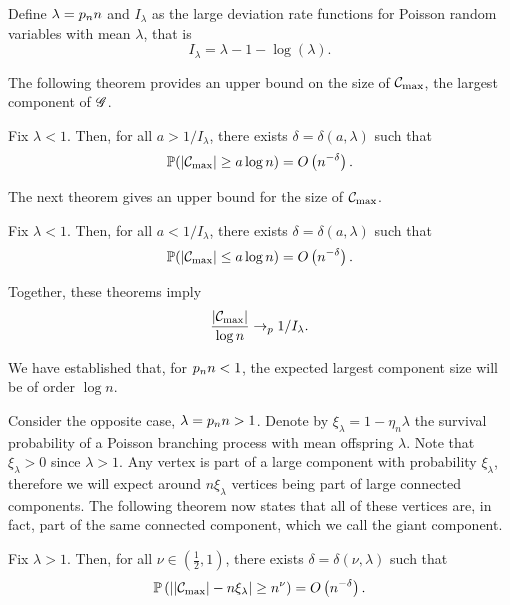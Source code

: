 Define $\lambda = p_n n$ and $I_{\lambda}$ as the large deviation rate functions for Poisson random variables with mean $\lambda$,
that is
\begin{equation}
	I_{\lambda} = \lambda - 1 - \log(\lambda).
\end{equation}

The following theorem provides an upper bound on the size of $\mathcal{C}_{\max}$, the largest component of $\mathscr{G}$.
\begin{theorem}
	Fix $\lambda < 1$. 
	Then, for all $a > 1/I_{\lambda}$, 
	there exists $\delta = \delta(a, \lambda)$ such that
	\begin{equation}
		\mathbb{P}( |\mathcal{C}_{\max}| \geq a \log n ) = O\left(n^{-\delta}\right).
	\end{equation}
\end{theorem}

The next theorem gives an upper bound for the size of $\mathcal{C}_{\max}$.
\begin{theorem}
	Fix $\lambda < 1$. 
	Then, for all $a < 1/I_{\lambda}$, 
	there exists $\delta = \delta(a, \lambda)$ such that
	\begin{equation}
	\mathbb{P}( |\mathcal{C}_{\max}| \leq a \log n ) = O\left(n^{-\delta}\right).
	\end{equation}
\end{theorem}

Together, these theorems imply
\begin{equation}
	\frac{|\mathcal{C}_{\max}|}{\log n} \rightarrow_p 1/I_{\lambda}.
\end{equation}

We have established that, for $p_n n < 1$, the expected largest component size will be of order $\log n$.

Consider the opposite case, $\lambda = p_n n > 1$. 
Denote by $\xi_\lambda = 1 - \eta_n\lambda$ the survival probability of a Poisson branching process with mean offspring $\lambda$.
Note that $\xi_\lambda > 0$ since $\lambda > 1$.
Any vertex is part of a large component with probability $\xi_\lambda$, 
therefore we will expect around $n \xi_\lambda$ vertices being part of large connected components.
The following theorem now states that all of these vertices are, in fact, part of the same connected component, which we call the giant component.
\begin{theorem}
	Fix $\lambda>1$.
	Then, for all $\nu \in (\frac{1}{2}, 1)$, there exists $\delta = \delta(\nu, \lambda)$ such that
	\begin{equation}
		\mathbb{P}\left( \left| |\mathcal{C}_{\max}| - n \xi_\lambda \right| \geq n^{\nu}\right) = O\left(n^{-\delta}\right).
	\end{equation}
\end{theorem}

